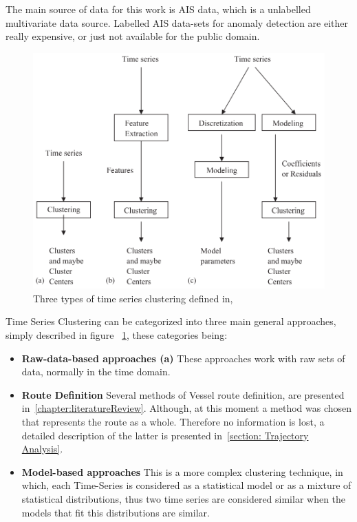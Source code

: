 The main source of data for this work is AIS data, which is a  unlabelled multivariate data source. Labelled AIS data-sets for anomaly detection are either really expensive, or just not available for the public domain.  


\begin{figure}[H]
	\centering
	\includegraphics[scale = .6]{figures/TimeSeriesClustering}
    \caption{Three types of time series clustering defined in, ~\cite{WarrenLiao2005}}
    \label{fig:TimeSeriesClustering}
\end{figure}

Time Series Clustering can be categorized into three main general approaches, simply described in figure ~\ref{fig:TimeSeriesClustering}, these categories being:

\begin{itemize}
\item \textbf{Raw-data-based approaches (a)} These approaches work with raw sets of data, normally in the time domain. 

\item \textbf{Route Definition} Several methods of Vessel route definition, are presented in~\ref{chapter:literatureReview}.
Although, at this moment a method was chosen that represents the route as a whole. Therefore no information is lost, a detailed description of the latter is presented in~\ref{section: Trajectory Analysis}.

\item \textbf{Model-based approaches} This is a more complex clustering technique, in which, each Time-Series is considered as a statistical model or as a mixture of statistical distributions, thus two time series are considered similar when the models that fit this distributions are similar. 
\end{itemize}



